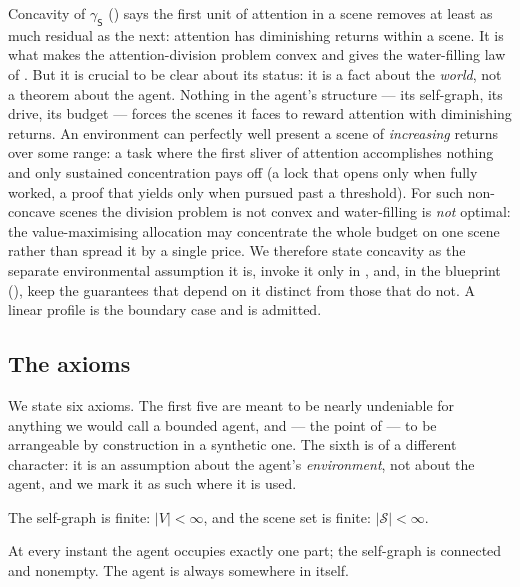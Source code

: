 \documentclass[11pt,twocolumn,a4paper]{article}
\newcommand{\V}{V}
\newcommand{\Scene}{\mathsf{S}}      %
\newcommand{\scenes}{\mathcal{S}}    %
\newcommand{\abs}[1]{\lvert#1\rvert}
\begin{document}
\begin{remark}
\label{rem:concave}
Concavity of $\gamma_\Scene$ () says the first unit of
attention in a scene removes at least as much residual as the next:
attention has diminishing returns within a scene. It is what makes the
attention-division problem convex and gives the water-filling law of
. But it is crucial to be clear about its status: it is
a fact about the \emph{world}, not a theorem about the agent. Nothing in
the agent's structure --- its self-graph, its drive, its budget --- forces
the scenes it faces to reward attention with diminishing returns. An
environment can perfectly well present a scene of \emph{increasing} returns
over some range: a task where the first sliver of attention accomplishes
nothing and only sustained concentration pays off (a lock that opens only
when fully worked, a proof that yields only when pursued past a threshold).
For such non-concave scenes the division problem is not convex and
water-filling is \emph{not} optimal: the value-maximising allocation may
concentrate the whole budget on one scene rather than spread it by a single
price. We therefore state concavity as the separate environmental
assumption it is, invoke it only in ,
and, in the blueprint (), keep the guarantees that
depend on it distinct from those that do not. A linear profile is the
boundary case and is admitted.
\end{remark}

\subsection{The axioms}

We state six axioms. The first five are meant to be nearly undeniable for
anything we would call a bounded agent, and --- the point of
 --- to be arrangeable by construction in a synthetic
one. The sixth is of a different character: it is an assumption about the
agent's \emph{environment}, not about the agent, and we mark it as such
where it is used.

\begin{axiom}[Finiteness]
\label{ax:finite}
The self-graph is finite: $\abs{\V}<\infty$, and the scene set is finite:
$\abs{\scenes}<\infty$.
\end{axiom}

\begin{axiom}[Presence]
\label{ax:present}
At every instant the agent occupies exactly one part; the self-graph is
connected and nonempty. The agent is always somewhere in itself.
\end{axiom}
\end{document}
